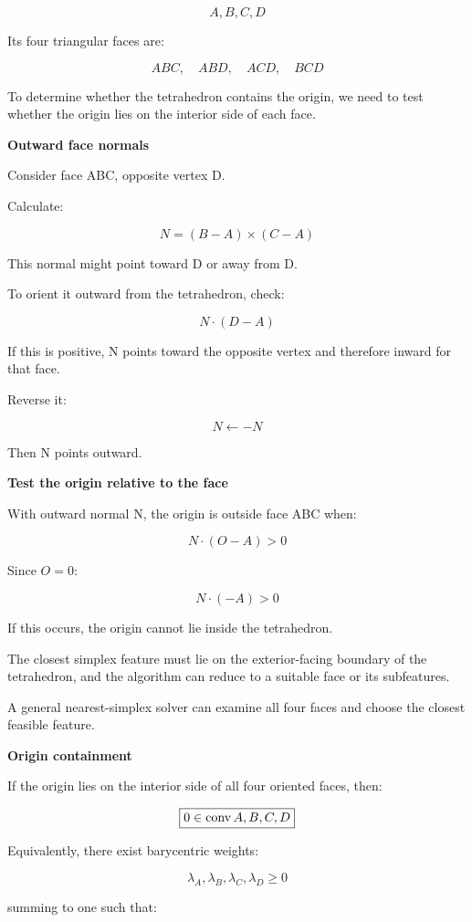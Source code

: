 \[
A,B,C,D
\]

Its four triangular faces are:

\[
ABC,\quad ABD,\quad ACD,\quad BCD
\]

To determine whether the tetrahedron contains the origin, we need to test whether the origin lies on the interior side of each face.

\textbf{Outward face normals}

Consider face ABC, opposite vertex D.

Calculate:

\[
N=(B-A)\times(C-A)
\]

This normal might point toward D or away from D.

To orient it outward from the tetrahedron, check:

\[
N\cdot(D-A)
\]

If this is positive, N points toward the opposite vertex and therefore inward for that face.

Reverse it:

\[
N\leftarrow-N
\]

Then N points outward.

\textbf{Test the origin relative to the face}

With outward normal N, the origin is outside face ABC when:

\[
N\cdot(O-A)>0
\]

Since \(O=0\):

\[
\boxed{ N\cdot(-A)>0 }
\]

If this occurs, the origin cannot lie inside the tetrahedron.

The closest simplex feature must lie on the exterior-facing boundary of the tetrahedron, and the algorithm can reduce to a suitable face or its subfeatures.

A general nearest-simplex solver can examine all four faces and choose the closest feasible feature.

\textbf{Origin containment}

If the origin lies on the interior side of all four oriented faces, then:

\[
\boxed{ 0\in\operatorname{conv}\\{A,B,C,D\\} }
\]

Equivalently, there exist barycentric weights:

\[
\lambda_A,\lambda_B,\lambda_C,\lambda_D\ge0
\]

summing to one such that:

